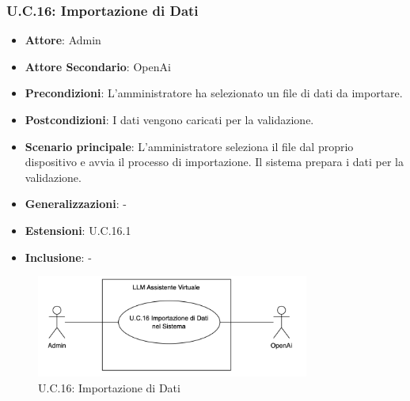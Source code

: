 \subsubsection{U.C.16: Importazione di Dati}
\begin{itemize}
    \item \textbf{Attore}: Admin
    \item \textbf{Attore Secondario}: OpenAi
    \item \textbf{Precondizioni}: L'amministratore ha selezionato un file di dati da importare.
    \item \textbf{Postcondizioni}: I dati vengono caricati per la validazione.
    \item \textbf{Scenario principale}: L'amministratore seleziona il file dal proprio dispositivo e avvia il processo di importazione. Il sistema prepara i dati per la validazione.
    \item \textbf{Generalizzazioni}: -
    \item \textbf{Estensioni}: U.C.16.1
    \item \textbf{Inclusione}: -
\end{itemize}
\begin{figure}[H]
    \centering
    \includegraphics[width=0.8\textwidth]{img/UC16.png}
    \caption{U.C.16: Importazione di Dati}
\end{figure}
\newpage

